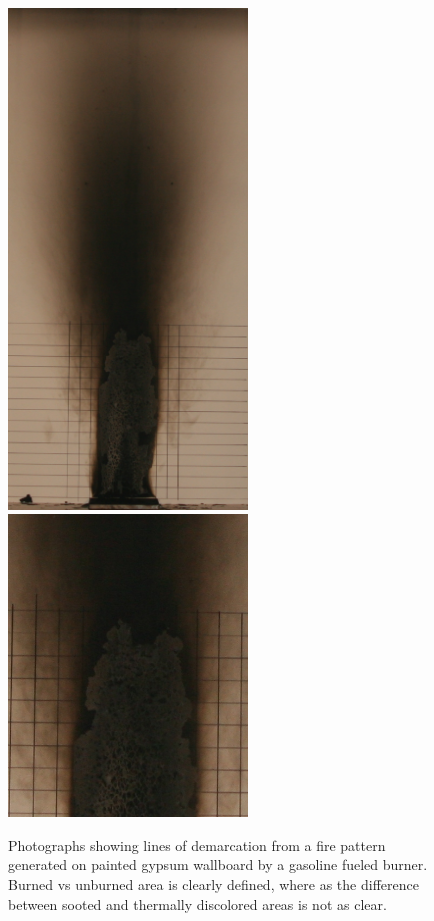 \documentclass[twoside]{uocthesis}
\begin{document}
\begin{figure}[p]
	\centering
	\includegraphics[width=2.5in]{../Figures/Soot_pattern}
	\includegraphics[width=2.5in]{../Figures/Soot_close}	\\
	\caption[Photographs showing lines of demarcation with gasoline]{Photographs showing lines of demarcation from a fire pattern generated on painted gypsum wallboard by a gasoline fueled burner.  Burned vs unburned area is clearly defined, where as the difference between sooted and thermally discolored areas is not as clear.}
	\label{Soot_pattern}
\end{figure}
\end{document}
